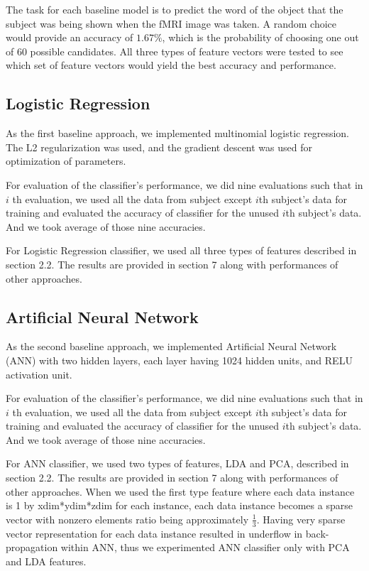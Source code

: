 \documentclass{article} %
\begin{document}
The task for each baseline model is to predict the word of the object that the subject was being shown when the fMRI image was taken. A random choice would provide an accuracy of $1.67\%$, which is the probability of choosing one out of 60 possible candidates. All three types of feature vectors were tested to see which set of feature vectors would yield the best accuracy and performance.

\subsection{Logistic Regression}

As the first baseline approach, we implemented multinomial logistic regression.  
The L2 regularization was used, and the gradient descent was used for optimization of parameters. 

For evaluation of the classifier's performance, we did nine evaluations such that in $i$ th evaluation, we used all the data from subject except $i$th subject's data for training and evaluated the accuracy of classifier for the unused $i$th subject's data. And we took average of those nine accuracies. 

For Logistic Regression classifier, we used all three types of features described in section 2.2. The results are provided in section 7 along with performances of other approaches. 

\subsection{Artificial Neural Network}

As the second baseline approach, we implemented Artificial Neural Network (ANN) with two hidden layers, each layer having 1024 hidden units, and RELU activation unit. 

For evaluation of the classifier's performance, we did nine evaluations such that in $i$ th evaluation, we used all the data from subject except $i$th subject's data for training and evaluated the accuracy of classifier for the unused $i$th subject's data. And we took average of those nine accuracies. 

For ANN classifier, we used two types of features, LDA and PCA, described in section 2.2. The results are provided in section 7 along with performances of other approaches. When we used the first type feature where each data instance is 1 by xdim*ydim*zdim for each instance, each data instance becomes a sparse vector with nonzero elements ratio being approximately $\frac{1}{3}$. Having very sparse vector representation for each data instance resulted in underflow in back-propagation within ANN, thus we experimented ANN classifier only with PCA and LDA features.  
\end{document}
